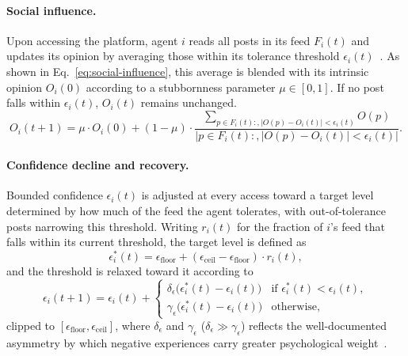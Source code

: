 \documentclass{svproc}
\def\BoundedConfidence{\epsilon} %
\def\feed{F}                    %
\def\Stubbornness{\mu}           %
\begin{document}
\paragraph{Social influence.}
Upon accessing the platform, agent $i$ reads all posts in its feed
$\feed_i(t)$ and updates its opinion by averaging those within its
tolerance threshold $\BoundedConfidence_i(t)$~\cite{friedkin1990}. As
shown in Eq.~\eqref{eq:social-influence}, this average is blended with
its intrinsic opinion $O_i(0)$ according to a stubbornness parameter
$\Stubbornness\in[0,1]$. If no post falls within
$\BoundedConfidence_i(t)$, $O_i(t)$ remains unchanged.
%
\begin{equation}
  O_i(t{+}1) = \Stubbornness\cdot O_i(0)
  + (1-\Stubbornness)\cdot
  \frac{\sum_{p\in \feed_i(t):,|O(p)-O_i(t)|<\BoundedConfidence_i(t)}
    O(p)}%
       {\big|{p\in \feed_i(t):,|O(p)-O_i(t)|<\BoundedConfidence_i(t)}\big|}.
  \label{eq:social-influence}
\end{equation}
%

\paragraph{Confidence decline and recovery.}
Bounded confidence $\BoundedConfidence_i(t)$ is adjusted at every
access toward a target level determined by how much of the feed the
agent tolerates, with out-of-tolerance posts narrowing this
threshold. Writing $r_i(t)$ for the fraction of $i$'s feed that falls
within its current threshold, the target level is defined as
%
\begin{equation} 
  \BoundedConfidence_i^{\ast}(t) =
  \BoundedConfidence_{\mathrm{floor}} + (\BoundedConfidence_{\mathrm{ceil}}-\BoundedConfidence_{\mathrm{floor}})\cdot r_i(t), 
\end{equation} 
%
and the threshold is relaxed toward it according to 
%
\begin{equation} 
  \BoundedConfidence_i(t{+}1) = \BoundedConfidence_i(t) +
  \begin{cases}
    \delta_{\BoundedConfidence}\!
    \big(\BoundedConfidence_i^{\ast}(t)-\BoundedConfidence_i(t)\big)
    & \text{if } \BoundedConfidence_i^{\ast}(t) <
    \BoundedConfidence_i(t), \\[2pt]
    \gamma_{\BoundedConfidence}\!
    \big(\BoundedConfidence_i^{\ast}(t)-\BoundedConfidence_i(t)\big)
      & \text{otherwise},
  \end{cases}\label{eq:bc}
\end{equation} 
%
clipped to
$[\BoundedConfidence_{\mathrm{floor}},\BoundedConfidence_{\mathrm{ceil}}]$,
where $\delta_{\BoundedConfidence}$ and $\gamma_{\BoundedConfidence}$
($\delta_{\BoundedConfidence}\gg\gamma_{\BoundedConfidence}$) reflects
the well-documented asymmetry by which negative experiences carry
greater psychological weight~\cite{baumeister2001}.
\par
\end{document}
